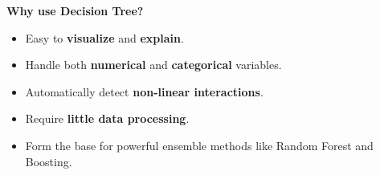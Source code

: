 \highspace
\begin{flushleft}
    \textcolor{Green3}{ \textbf{Why use Decision Tree?}}
\end{flushleft}
\begin{itemize}
    \item Easy to \textbf{visualize} and \textbf{explain}.
    \item Handle both \textbf{numerical} and \textbf{categorical} variables.
    \item Automatically detect \textbf{non-linear interactions}.
    \item Require \textbf{little data processing}.
    \item Form the base for powerful ensemble methods like Random Forest and Boosting.
\end{itemize}